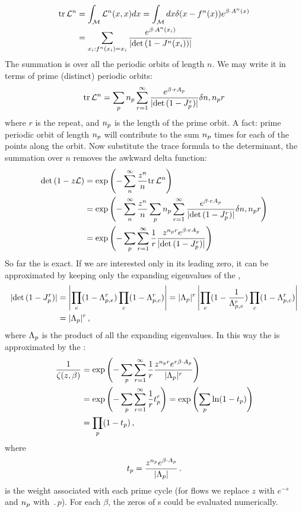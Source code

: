 \begin{description}
\begin{align*}
\mbox{\rm tr}\,  {\cal L}^{n} & =\int_{\mathcal{M}}{\cal L}^{n}(x,x)dx=\int_{\mathcal{M}}dx\delta(x-f^{n}(x))e^{\beta\cdot A^{n}(x)}\\
 & =\sum_{x_{i}:f^{n}(x_{i})=x_{i}}\frac{e^{\beta\cdot A^{n}(x_{i})}}{\vert\mbox{\rm det}\, (1-J^{n}(x_{i}))\vert}
\end{align*}
The summation is over all the periodic orbits of length $n$. We may
write it in terms of prime (distinct) periodic orbits:
\[
\mbox{\rm tr}\,  {\cal L}^{n}=\sum_{p}{n_{p}}\sum_{r=1}^{\infty}
\frac{e^{\beta\cdot rA_{p}}}{\vert\mbox{\rm det}\, (1-J_{p}^{r})\vert}\delta n,{n_{p}}r
\]
where $r$ is the repeat, and ${n_{p}}$ is the length of the
prime orbit. A fact: prime periodic orbit of length ${n_{p}}$ will
contribute to the sum ${n_{p}}$ times for each of the points along
the orbit. Now substitute the trace formula to the determinant, the
summation over $n$ removes the awkward delta function:
\begin{align*}
\mbox{\rm det}\, (1-z{\cal L}) & =\exp\left(-\sum_{n}^{\infty}\frac{z^{n}}{n}\mbox{\rm tr}\,  {\cal L}^{n}\right)\\
 & =\exp\left(-\sum_{n}^{\infty}\frac{z^{n}}{n}\sum_{p}{n_{p}}\sum_{r=1}^{\infty}\frac{e^{\beta\cdot rA_{p}}}{\vert\mbox{\rm det}\, (1-J_{p}^{r})\vert}\delta n,{n_{p}}r\right)\\
 & =\exp\left(-\sum_{p}\sum_{r=1}^{\infty}\frac{1}{r}\frac{z^{{n_{p}}r}e^{\beta\cdot rA_{p}}}{\vert\mbox{\rm det}\, (1-J_{p}^{r})\vert}\right)
\end{align*}
So far the {\Fd} is exact. If we are interested only in its leading
zero, it can be approximated by keeping only the expanding
eigenvalues of the {\jacobianM},
\begin{align*}
\vert\mbox{\rm det}\, (1-J_{p}^{r})\vert
 & =\left|\prod_{e}(1-\Lambda_{p,e}^{r})\prod_{c}(1-\Lambda_{p,c}^{r})\right|
 =\vert\Lambda_{p}\vert^{r}\left|\prod_{e}(1-\frac{1}{\Lambda_{p,e}^{r}})
                                  \prod_{c}(1-\Lambda_{p,c}^{r})\right|\\
 & =\vert\Lambda_{p}\vert^{r}
\,,
\end{align*}
where $\Lambda_{p}$ is the product of all the expanding
eigenvalues. In this way the {\Fd} is approximated by the {\dzeta}:
\begin{align*}
\frac{1}{\zeta(z,\beta)} & =\exp\left(-\sum_{p}\sum_{r=1}^{\infty}\frac{1}{r}\frac{z^{{n_{p}}r}e^{r\beta\cdot A_{p}}}{\vert\Lambda_{p}\vert^{r}}\right)\\
 & =\exp\left(-\sum_{p}\sum_{r=1}^{\infty}\frac{1}{r}t_{p}^{r}\right)
   =\exp\left(\sum_{p}\ln(1-t_{p})\right)\\
 & =\prod_{p}(1-t_{p})
\,,
\end{align*}
where
\[
t_{p}=\frac{z^{{n_{p}}}e^{\beta\cdot A_{p}}}{\vert\Lambda_{p}\vert}
\,.
\]
is the weight associated with each prime cycle (for flows we
replace $z$ with $e^{-s}$ and ${n_{p}}$ with $\period{p}$). For each
$\beta$, the zeros of {\dzeta}s could be evaluated
numerically.

\end{description}
